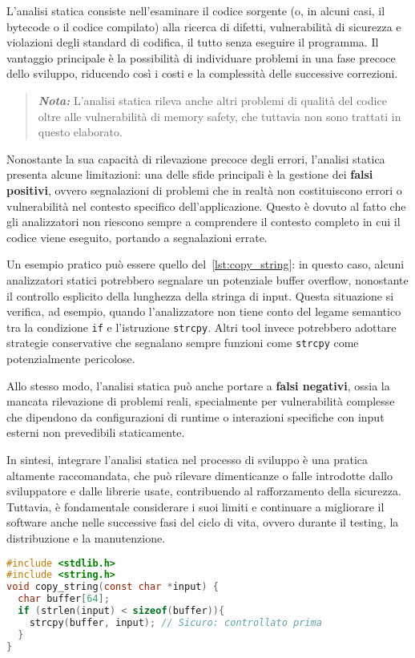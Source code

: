 L'analisi statica consiste nell'esaminare il codice sorgente (o, in alcuni casi,
il bytecode o il codice compilato) alla ricerca di difetti, vulnerabilità di
sicurezza e violazioni degli standard di codifica, il tutto senza eseguire il programma.
Il vantaggio principale è la possibilità di individuare problemi in una fase
precoce dello sviluppo, riducendo così i costi e la complessità delle successive
correzioni.

\begin{quote}
  \textbf{\textit{Nota:}} L'analisi statica rileva anche altri problemi di
  qualità del codice oltre alle vulnerabilità di memory safety, che tuttavia non
  sono trattati in questo elaborato.
\end{quote}

\noindent
Nonostante la sua capacità di rilevazione precoce degli errori, l'analisi statica
presenta alcune limitazioni: una delle sfide principali è la gestione dei
\textbf{falsi positivi}, ovvero segnalazioni di problemi che in realtà non
costituiscono errori o vulnerabilità nel contesto specifico dell'applicazione. Questo
è dovuto al fatto che gli analizzatori non riescono sempre a comprendere il contesto
completo in cui il codice viene eseguito, portando a segnalazioni errate.

Un esempio pratico può essere quello del~\autoref{lst:copy_string}: in questo caso,
alcuni analizzatori statici potrebbero segnalare un potenziale buffer overflow, nonostante
il controllo esplicito della lunghezza della stringa di input. Questa situazione
si verifica, ad esempio, quando l'analizzatore non tiene conto del legame
semantico tra la condizione \texttt{if} e l'istruzione \texttt{strcpy}. Altri tool
invece potrebbero adottare strategie conservative che segnalano sempre funzioni come
\texttt{strcpy} come potenzialmente pericolose.

Allo stesso modo, l'analisi statica può anche portare a \textbf{falsi negativi},
ossia la mancata rilevazione di problemi reali, specialmente per vulnerabilità
complesse che dipendono da configurazioni di runtime o interazioni specifiche
con input esterni non prevedibili staticamente.

In sintesi, integrare l'analisi statica nel processo di sviluppo è una pratica altamente
raccomandata, che può rilevare dimenticanze o falle introdotte dallo
sviluppatore e dalle librerie usate, contribuendo al rafforzamento della sicurezza.
Tuttavia, è fondamentale considerare i suoi limiti e continuare a migliorare il software
anche nelle successive fasi del ciclo di vita, ovvero durante il testing, la distribuzione
e la manutenzione.

\bigskip
\begin{lstlisting}[language=C, caption={Copia sicura di una stringa con \texttt{strcpy()}}, label={lst:copy_string}]
#include <stdlib.h>
#include <string.h>
void copy_string(const char *input) {
  char buffer[64];
  if (strlen(input) < sizeof(buffer)){
    strcpy(buffer, input); // Sicuro: controllato prima
  }
}
\end{lstlisting}